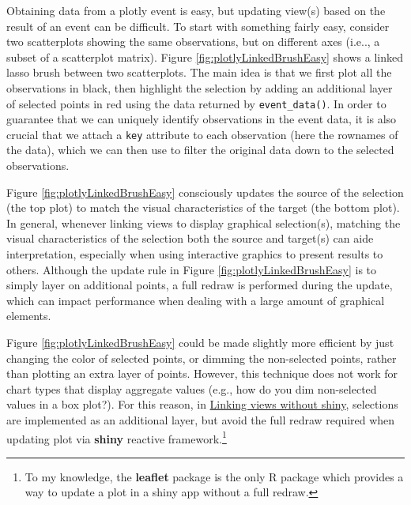 \documentclass[12pt,]{isuthesis}
\let\rmarkdownfootnote\footnote%
\def\footnote{\protect\rmarkdownfootnote}
\begin{document}
Obtaining data from a plotly event is easy, but updating view(s) based
on the result of an event can be difficult. To start with something
fairly easy, consider two scatterplots showing the same observations,
but on different axes (i.e.., a subset of a scatterplot matrix). Figure
\ref{fig:plotlyLinkedBrushEasy} shows a linked lasso brush between two
scatterplots. The main idea is that we first plot all the observations
in black, then highlight the selection by adding an additional layer of
selected points in red using the data returned by
\texttt{event\_data()}. In order to guarantee that we can uniquely
identify observations in the event data, it is also crucial that we
attach a \texttt{key} attribute to each observation (here the rownames
of the data), which we can then use to filter the original data down to
the selected observations.

Figure \ref{fig:plotlyLinkedBrushEasy} consciously updates the source of
the selection (the top plot) to match the visual characteristics of the
target (the bottom plot). In general, whenever linking views to display
graphical selection(s), matching the visual characteristics of the
selection both the source and target(s) can aide interpretation,
especially when using interactive graphics to present results to others.
Although the update rule in Figure \ref{fig:plotlyLinkedBrushEasy} is to
simply layer on additional points, a full redraw is performed during the
update, which can impact performance when dealing with a large amount of
graphical elements.

Figure \ref{fig:plotlyLinkedBrushEasy} could be made slightly more
efficient by just changing the color of selected points, or dimming the
non-selected points, rather than plotting an extra layer of points.
However, this technique does not work for chart types that display
aggregate values (e.g., how do you dim non-selected values in a box
plot?). For this reason, in
\protect\hyperlink{linking-views-without-shiny}{Linking views without
shiny}, selections are implemented as an additional layer, but avoid the
full redraw required when updating plot via \textbf{shiny} reactive
framework.\footnote{To my knowledge, the \textbf{leaflet} package is the
  only R package which provides a way to update a plot in a shiny app
  without a full redraw.}
\end{document}
